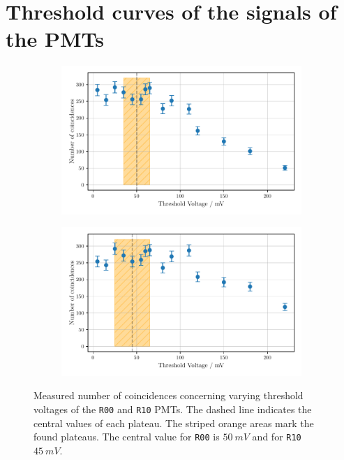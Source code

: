 \chapter{Threshold curves of the signals of the PMTs}
\label{sec:appendix}
\begin{figure}
    \centering
    \begin{subfigure}[b]{0.48\textwidth}
    \includegraphics[width=\textwidth]{plots/threshR00.pdf}
\end{subfigure}\hfill
\begin{subfigure}[b]{0.48\textwidth}
    \includegraphics[width=\textwidth]{plots/threshR10_2.pdf}
\end{subfigure}
\caption{Measured number of coincidences concerning varying threshold voltages
of the \texttt{R00} and \texttt{R10} PMTs.
The dashed line indicates the central values of each plateau. The striped orange areas mark the found plateaus.
The central value for \texttt{R00} is $\SI{50}{mV}$ and for \texttt{R10} $\SI{45}{mV}$.}
\label{fig:appthresh1}
\end{figure}
